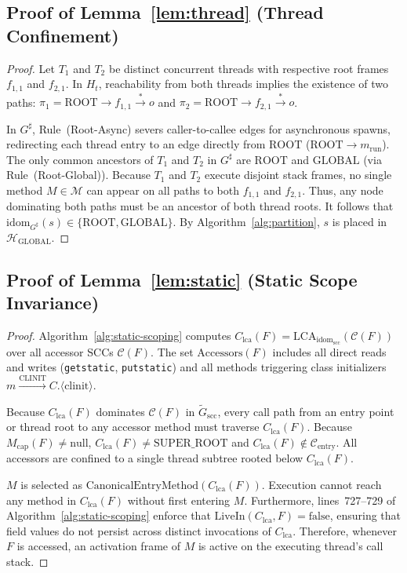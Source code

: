 \documentclass[12pt,a4paper]{article}
\newcommand{\GLOBAL}{\text{GLOBAL}}
\newcommand{\ROOT}{\text{ROOT}}
\newcommand{\idom}{\text{idom}}
\begin{document}
\subsection{Proof of Lemma~\ref{lem:thread} (Thread Confinement)}
\label{sec:proof-lem-thread}

\begin{proof}
Let $T_1$ and $T_2$ be distinct concurrent threads with respective root frames $f_{1,1}$ and $f_{2,1}$. In $H_t$, reachability from both threads implies the existence of two paths: $\pi_1 = \ROOT \to f_{1,1} \xrightarrow{*} o$ and $\pi_2 = \ROOT \to f_{2,1} \xrightarrow{*} o$.

In $G^\sharp$, Rule~(Root-Async) severs caller-to-callee edges for asynchronous spawns, redirecting each thread entry to an edge directly from $\ROOT$ ($\ROOT \to m_{\text{run}}$). The only common ancestors of $T_1$ and $T_2$ in $G^\sharp$ are $\ROOT$ and $\GLOBAL$ (via Rule~(Root-Global)). Because $T_1$ and $T_2$ execute disjoint stack frames, no single method $M \in \mathcal{M}$ can appear on all paths to both $f_{1,1}$ and $f_{2,1}$. Thus, any node dominating both paths must be an ancestor of both thread roots. It follows that $\idom_{G^\sharp}(s) \in \{\ROOT, \GLOBAL\}$. By Algorithm~\ref{alg:partition}, $s$ is placed in $\mathcal{H}_{\GLOBAL}$.
\end{proof}

\subsection{Proof of Lemma~\ref{lem:static} (Static Scope Invariance)}
\label{sec:proof-lem-static}

\begin{proof}
Algorithm~\ref{alg:static-scoping} computes $C_{\text{lca}}(F) = \text{LCA}_{\idom_{\text{scc}}}(\mathcal{C}(F))$ over all accessor SCCs $\mathcal{C}(F)$. The set $\text{Accessors}(F)$ includes all direct reads and writes (\texttt{getstatic}, \texttt{putstatic}) and all methods triggering class initializers $m \xrightarrow{\text{CLINIT}} C.\langle\text{clinit}\rangle$.

Because $C_{\text{lca}}(F)$ dominates $\mathcal{C}(F)$ in $\widetilde{G}_{\text{scc}}$, every call path from an entry point or thread root to any accessor method must traverse $C_{\text{lca}}(F)$. Because $M_{\text{cap}}(F) \neq \text{null}$, $C_{\text{lca}}(F) \neq \text{SUPER\_ROOT}$ and $C_{\text{lca}}(F) \notin \mathcal{C}_{\text{entry}}$. All accessors are confined to a single thread subtree rooted below $C_{\text{lca}}(F)$.

$M$ is selected as $\text{CanonicalEntryMethod}(C_{\text{lca}}(F))$. Execution cannot reach any method in $C_{\text{lca}}(F)$ without first entering $M$. Furthermore, lines~727--729 of Algorithm~\ref{alg:static-scoping} enforce that $\text{LiveIn}(C_{\text{lca}}, F) = \text{false}$, ensuring that field values do not persist across distinct invocations of $C_{\text{lca}}$. Therefore, whenever $F$ is accessed, an activation frame of $M$ is active on the executing thread's call stack.
\end{proof}
\end{document}
